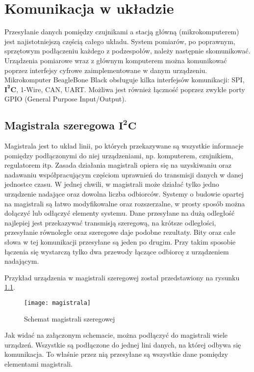 \chapter{Komunikacja w układzie}

Przesyłanie danych pomiędzy czujnikami a stacją główną (mikrokomputerem) jest najistotniejszą częścią całego układu. System pomiarów, po poprawnym, sprzętowym podłączeniu każdego z podzespołów, należy następnie skomunikować. Urządzenia pomiarowe wraz z głównym komputerem można komunikować poprzez interfejsy cyfrowe zaimplementowane w danym urządzeniu. Mikrokomputer BeagleBone Black obsługuje kilka interfejsów komunikacji: SPI, $\mathbf{I^{2}C}$, 1-Wire, CAN, UART. Możliwa jest również łączność poprzez zwykłe porty GPIO (General Purpose Input/Output).

\section{Magistrala szeregowa $\mathbf{I^{2}C}$}
Magistrala jest to układ linii, po których przekazywane są wszystkie informacje pomiędzy podłączonymi do niej urządzeniami, np. komputerem, czujnikiem, regulatorem itp. Zasada działania magistrali opiera się na uzyskiwaniu oraz nadawaniu współpracującym częściom uprawnień do transmisji danych w danej jednostce czasu. W jednej chwili, w magistrali może działać tylko jedno urządzenie nadające oraz dowolna liczba odbiorców. Systemy o budowie opartej na magistrali są łatwo modyfikowalne oraz rozszerzalne, w prosty sposób można dołączyć lub odłączyć elementy systemu.
Dane przesyłane na dużą odległość najlepiej jest przekazywać transmisją szeregową, na krótsze odległości, przesyłanie równoległe oraz szeregowe daje podobne rezultaty.
Bity oraz całe słowa w tej komunikacji przesyłane są jeden po drugim. Przy takim sposobie łączenia się wystarczą tylko dwa przewody łączące odbiorcę z urządzeniem nadającym. 

Przykład urządzenia w magistrali szeregowej został przedstawiony na  rysunku \ref{fig:magistrala}.
\begin{figure}[h]
\centering
\texttt{[image: magistrala]}
\caption{Schemat magistrali szeregowej}
\label{fig:magistrala}
\end{figure}

Jak widać na załączonym schemacie, można podłączyć do magistrali wiele urządzeń. Wszystkie są podłączone do jednej lini danych, na której odbywa się komunikacja. To właśnie przez nią przesyłane są wszystkie dane pomiędzy elementami magistrali.


